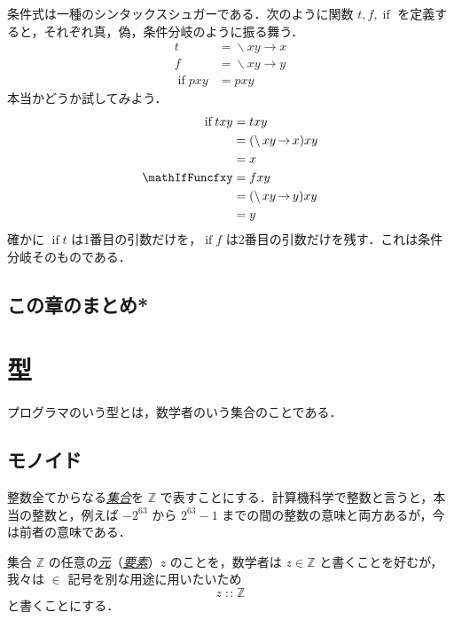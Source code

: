 \documentclass[a4paper]{jsbook}
\newenvironment{leader}{\begingroup}{\endgroup}
\newcommand{\keyword}[1]{{\underline{\emph{#1}}}}
\newcommand{\mSpecialSet}[1]{\mathbb{#1}} %
\newcommand{\mZSet}{\mSpecialSet{Z}}
\DeclareMathOperator{\mIfFunc}{if}
\DeclareMathOperator{\mLambda}{\backslash}
\DeclareMathOperator{\mLambdaArrow}{\rightarrow}
\DeclareMathOperator{\mIn}{{:\!:}}
\newcommand{\mLambdaExp}[2]{\mLambda{#1}\mLambdaArrow{#2}}
\DeclareMathOperator{\mathIfFunc}{if}
\begin{document}
条件式は一種のシンタックスシュガーである．次のように関数 $t,f,\mIfFunc$ を定義すると，それぞれ真，偽，条件分岐のように振る舞う．
\begin{align}
t&=\mLambdaExp{xy}{x}\\
f&=\mLambdaExp{xy}{y}\\
\mathIfFunc pxy&=pxy
\end{align}
本当かどうか試してみよう．
\begin{align}
\mathIfFunc txy&=txy\\
&=(\mLambdaExp{xy}{x})xy\\
&=x\\
\mathIfFuncfxy&=fxy\\
&=(\mLambdaExp{xy}{y})xy\\
&=y
\end{align}
確かに $\mIfFunc t$ は1番目の引数だけを，$\mIfFunc f$ は2番目の引数だけを残す．これは条件分岐そのものである．

\section{この章のまとめ*}



\chapter{型}

\begin{leader}
プログラマのいう型とは，数学者のいう集合のことである．
\end{leader}

\section{モノイド}

整数全てからなる\keyword{集合}を $\mZSet$ で表すことにする．計算機科学で整数と言うと，本当の整数と，例えば $-2^{63}$ から $2^{63}-1$ までの間の整数の意味と両方あるが，今は前者の意味である．

集合 $\mZSet$ の任意の\keyword{元}（\keyword{要素}）$z$ のことを，数学者は $z\in\mZSet$ と書くことを好むが，我々は $\in$ 記号を別な用途に用いたいため
\begin{equation}
\label{eq:totality}
z\mIn\mZSet
\end{equation}
と書くことにする．
\end{document}
